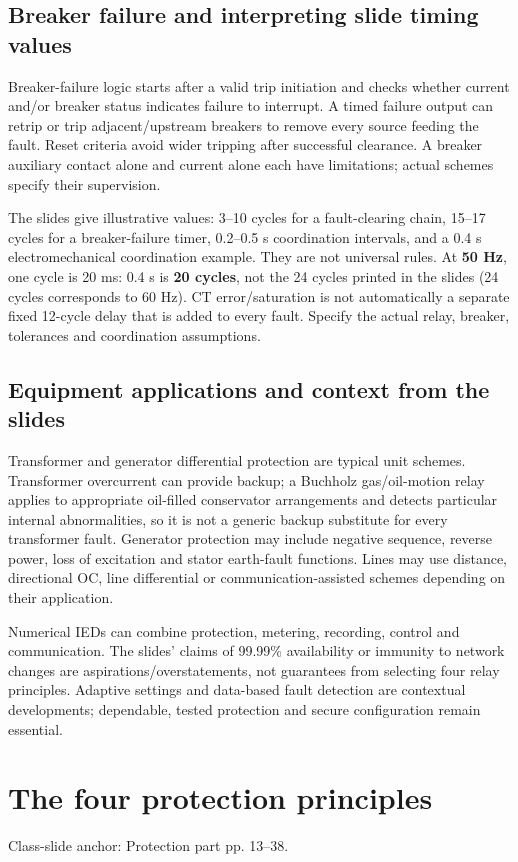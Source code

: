 \documentclass[11pt,a4paper]{article}
\newcommand{\slides}[1]{{\small\color{muted}\textsf{Class-slide anchor: #1.}}\par}
\newcommand{\chapterstart}[2]{\clearpage\section{#1}\label{#2}}
\begin{document}
\Needspace{115mm}
\subsection{Breaker failure and interpreting slide timing values}
Breaker-failure logic starts after a valid trip initiation and checks whether current and/or breaker status indicates failure to interrupt. A timed failure output can retrip or trip adjacent/upstream breakers to remove every source feeding the fault. Reset criteria avoid wider tripping after successful clearance. A breaker auxiliary contact alone and current alone each have limitations; actual schemes specify their supervision.

The slides give illustrative values: 3--10 cycles for a fault-clearing chain, 15--17 cycles for a breaker-failure timer, 0.2--0.5 s coordination intervals, and a 0.4 s electromechanical coordination example. They are not universal rules. At \textbf{50 Hz}, one cycle is 20 ms: 0.4 s is \textbf{20 cycles}, not the 24 cycles printed in the slides (24 cycles corresponds to 60 Hz). CT error/saturation is not automatically a separate fixed 12-cycle delay that is added to every fault. Specify the actual relay, breaker, tolerances and coordination assumptions.

\subsection{Equipment applications and context from the slides}
Transformer and generator differential protection are typical unit schemes. Transformer overcurrent can provide backup; a Buchholz gas/oil-motion relay applies to appropriate oil-filled conservator arrangements and detects particular internal abnormalities, so it is not a generic backup substitute for every transformer fault. Generator protection may include negative sequence, reverse power, loss of excitation and stator earth-fault functions. Lines may use distance, directional OC, line differential or communication-assisted schemes depending on their application.

Numerical IEDs can combine protection, metering, recording, control and communication. The slides' claims of 99.99\% availability or immunity to network changes are aspirations/overstatements, not guarantees from selecting four relay principles. Adaptive settings and data-based fault detection are contextual developments; dependable, tested protection and secure configuration remain essential.

\chapterstart{The four protection principles}{principles}
\slides{Protection part pp. 13--38}
\end{document}

